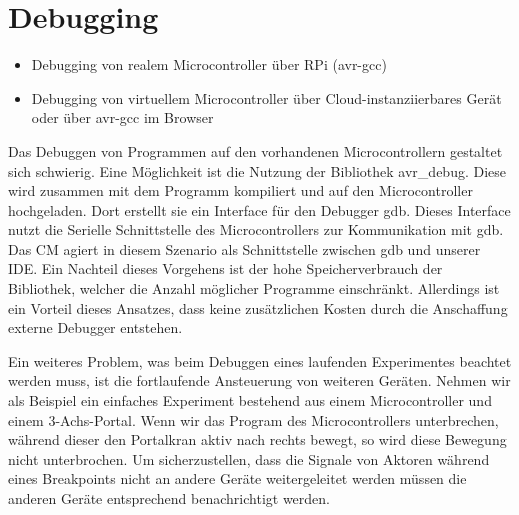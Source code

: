 \section{Debugging} \label{debugging}

\begin{itemize}
    \item Debugging von realem Microcontroller über RPi (avr-gcc)
    \item Debugging von virtuellem Microcontroller über Cloud-instanziierbares Gerät oder über avr-gcc im Browser
\end{itemize}

Das Debuggen von Programmen auf den vorhandenen Microcontrollern gestaltet sich schwierig. Eine Möglichkeit ist die Nutzung der Bibliothek avr\_debug. Diese wird zusammen mit dem Programm kompiliert und auf den Microcontroller hochgeladen. Dort erstellt sie ein Interface für den Debugger gdb. Dieses Interface nutzt die Serielle Schnittstelle des Microcontrollers zur Kommunikation mit gdb. Das CM agiert in diesem Szenario als Schnittstelle zwischen gdb und unserer IDE. Ein Nachteil dieses Vorgehens ist der hohe Speicherverbrauch der Bibliothek, welcher die Anzahl möglicher Programme einschränkt. Allerdings ist ein Vorteil dieses Ansatzes, dass keine zusätzlichen Kosten durch die Anschaffung externe Debugger entstehen.

Ein weiteres Problem, was beim Debuggen eines laufenden Experimentes beachtet werden muss, ist die fortlaufende Ansteuerung von weiteren Geräten. Nehmen wir als Beispiel ein einfaches Experiment bestehend aus einem Microcontroller und einem 3-Achs-Portal. Wenn wir das Program des Microcontrollers unterbrechen, während dieser den Portalkran aktiv nach rechts bewegt, so wird diese Bewegung nicht unterbrochen. Um sicherzustellen, dass die Signale von Aktoren während eines Breakpoints nicht an andere Geräte weitergeleitet werden müssen die anderen Geräte entsprechend benachrichtigt werden.